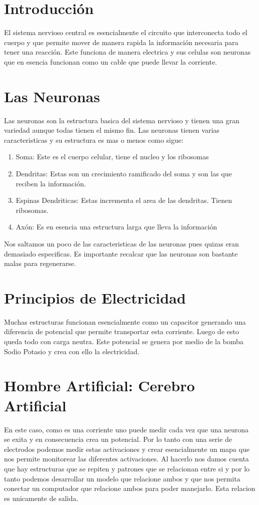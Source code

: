 


    

    \section{Introducción}
    El sistema nervioso central es esencialmente el circuito que interconecta todo el cuerpo y que permite mover de manera rapida la información necesaria para tener una reacción. Este funciona de manera electrica y sus celulas son neuronas que en esencia funcionan como un cable que puede llevar la corriente.

    \section{Las Neuronas}

    Las neuronas son la estructura basica del sistema nervioso y tienen una gran variedad aunque todas tienen el mismo fin. Las neuronas tienen varias caracteristicas y su estructura es mas o menos como sigue:
    \begin{enumerate}
      \item Soma: Este es el cuerpo celular, tiene el nucleo y los ribosomas
      \item Dendritas: Estas son un crecimiento ramificado del soma y son las que reciben la información.
      \item Espinas Dendriticas: Estas incrementa el area de las dendritas. Tienen ribosomas.
      \item Axón: Es en esencia una estructura larga que lleva la información
    \end{enumerate}
    
    Nos saltamos un poco de las caracteristicas de las neuronas pues quizas eran demasiado especificas. Es importante recalcar que las neuronas son bastante malas para regenerarse.

    \section{Principios de Electricidad}
    Muchas estructuras funcionan esencialmente como un capacitor generando una diferencia de potencial que permite transportar esta corriente. Luego de esto queda  todo con carga neutra. Este potencial se genera por medio de la bomba Sodio Potasio y crea con ello la electricidad.

    \section{Hombre Artificial: Cerebro Artificial}

    En este caso, como es una corriente uno puede medir cada vez que una neurona se exita y en consecuencia crea un potencial. Por lo tanto con una serie de electrodos podemos medir estas activaciones y crear esencialmente un mapa que nos permite monitorear las diferentes activaciones. Al hacerlo nos damos cuenta que hay estructuras que se repiten y patrones que se relacionan entre si y por lo tanto podemos desarrollar un modelo que relacione ambos y que nos permita conectar un computador que relacione ambos para poder manejarlo. Esta relacion es unicamente de salida.

